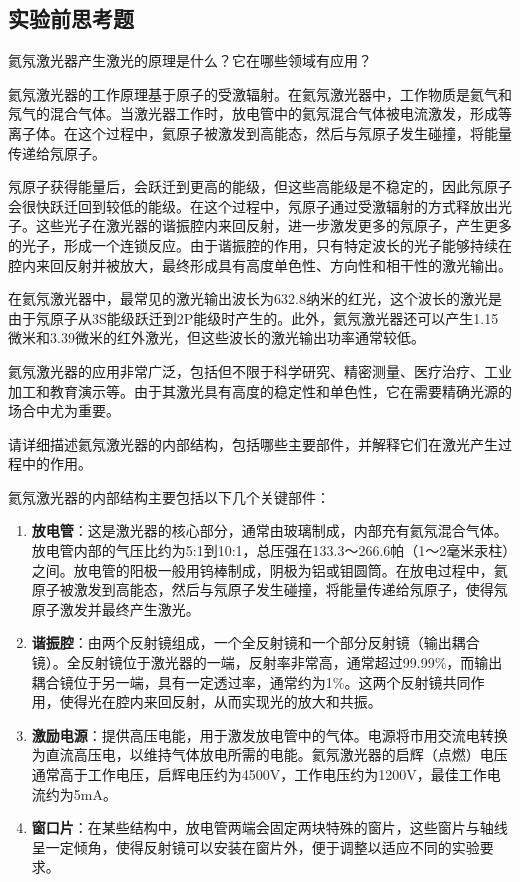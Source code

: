 \documentclass[dvipsnames, svgnames,a4paper,11pt]{article}
\begin{document}
\subsection{实验前思考题}

\begin{question}
	氦氖激光器产生激光的原理是什么？它在哪些领域有应用？
\end{question}

	氦氖激光器的工作原理基于原子的受激辐射。在氦氖激光器中，工作物质是氦气和氖气的混合气体。当激光器工作时，放电管中的氦氖混合气体被电流激发，形成等离子体。在这个过程中，氦原子被激发到高能态，然后与氖原子发生碰撞，将能量传递给氖原子。

	氖原子获得能量后，会跃迁到更高的能级，但这些高能级是不稳定的，因此氖原子会很快跃迁回到较低的能级。在这个过程中，氖原子通过受激辐射的方式释放出光子。这些光子在激光器的谐振腔内来回反射，进一步激发更多的氖原子，产生更多的光子，形成一个连锁反应。由于谐振腔的作用，只有特定波长的光子能够持续在腔内来回反射并被放大，最终形成具有高度单色性、方向性和相干性的激光输出。

	在氦氖激光器中，最常见的激光输出波长为632.8纳米的红光，这个波长的激光是由于氖原子从3S能级跃迁到2P能级时产生的。此外，氦氖激光器还可以产生1.15微米和3.39微米的红外激光，但这些波长的激光输出功率通常较低。

	氦氖激光器的应用非常广泛，包括但不限于科学研究、精密测量、医疗治疗、工业加工和教育演示等。由于其激光具有高度的稳定性和单色性，它在需要精确光源的场合中尤为重要。
	


\begin{question}
	请详细描述氦氖激光器的内部结构，包括哪些主要部件，并解释它们在激光产生过程中的作用。
\end{question}

	
	氦氖激光器的内部结构主要包括以下几个关键部件：

	\begin{enumerate}
		\item \textbf{放电管}：这是激光器的核心部分，通常由玻璃制成，内部充有氦氖混合气体。放电管内部的气压比约为5:1到10:1，总压强在133.3～266.6帕（1～2毫米汞柱）之间。放电管的阳极一般用钨棒制成，阴极为铝或钼圆筒。在放电过程中，氦原子被激发到高能态，然后与氖原子发生碰撞，将能量传递给氖原子，使得氖原子激发并最终产生激光。
		\item \textbf{谐振腔}：由两个反射镜组成，一个全反射镜和一个部分反射镜（输出耦合镜）。全反射镜位于激光器的一端，反射率非常高，通常超过99.99\%，而输出耦合镜位于另一端，具有一定透过率，通常约为1\%。这两个反射镜共同作用，使得光在腔内来回反射，从而实现光的放大和共振。
		\item \textbf{激励电源}：提供高压电能，用于激发放电管中的气体。电源将市用交流电转换为直流高压电，以维持气体放电所需的电能。氦氖激光器的启辉（点燃）电压通常高于工作电压，启辉电压约为4500V，工作电压约为1200V，最佳工作电流约为5mA。
		\item \textbf{窗口片}：在某些结构中，放电管两端会固定两块特殊的窗片，这些窗片与轴线呈一定倾角，使得反射镜可以安装在窗片外，便于调整以适应不同的实验要求。
	\end{enumerate}
\end{document}
